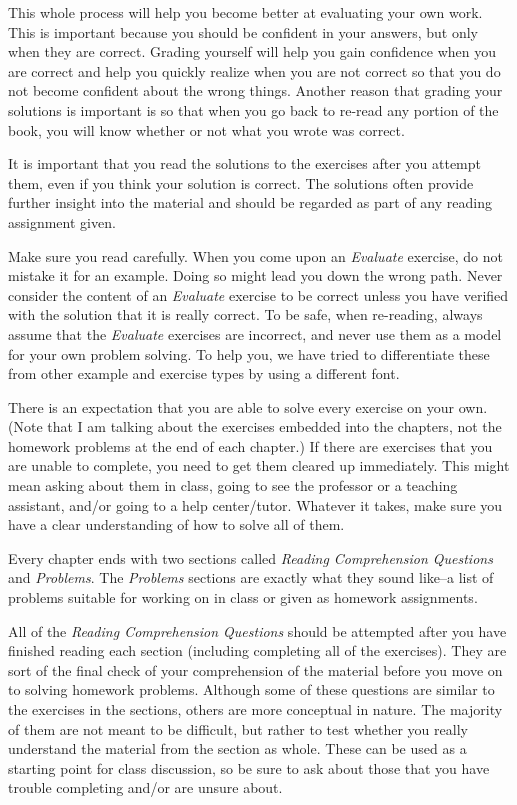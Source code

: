 This whole process will help you become better at evaluating your own work. 
This is important because you should be confident in your answers, but only when they
are correct.  Grading yourself will help you gain confidence when you are correct and
help you quickly realize when you are not correct so that you do not
become confident about the wrong things.
Another reason that grading your solutions is important is so that when you go back
to re-read any portion of the book, you will know whether or not what you wrote
was correct.

It is important that you read the solutions to the exercises after you attempt them, even if you
think your solution is correct.  
The solutions often provide further insight into the material and should be regarded 
as part of any reading assignment given.

Make sure you read carefully.  When you come upon an {\em Evaluate} exercise, do not
mistake it for an example.  Doing so might lead you down the wrong path.  Never consider
the content of an {\em Evaluate} exercise to be correct unless you have verified with the 
solution that it is really correct.  To be safe, when re-reading, always assume that the
{\em Evaluate} exercises are incorrect, and never use them as a model for your own problem 
solving.  To help you, we have tried to differentiate these from other example and exercise
types by using a different font.

There is an expectation that you are able to solve every exercise on your own.
(Note that I am talking about the exercises embedded into the chapters, 
not the homework problems at the end of each chapter.)
If there are exercises that you are unable to complete, you need to get them cleared up
immediately.  This might mean asking about them in class, going to see the professor or a
teaching assistant, and/or going to a help center/tutor.  Whatever it takes, make sure you 
have a clear understanding of how to solve all of them.  

Every chapter ends with two sections called {\em Reading Comprehension Questions}
and {\em Problems}. The {\em Problems} sections are exactly what they sound like--a list of problems
suitable for working on in class or given as homework assignments.

All of the {\em Reading Comprehension Questions} should be attempted after
you have finished reading each section (including completing all of the exercises). 
They are sort of the final check of your comprehension of the material before you move on to solving 
homework problems.
Although some of these questions are similar to the exercises in the sections,
others are more conceptual in nature. The majority of them are not meant to be difficult, but rather to
test whether you really understand the material from the section as whole. These can be used as a starting point
for class discussion, so be sure to ask about those that you have trouble completing and/or are unsure about.

